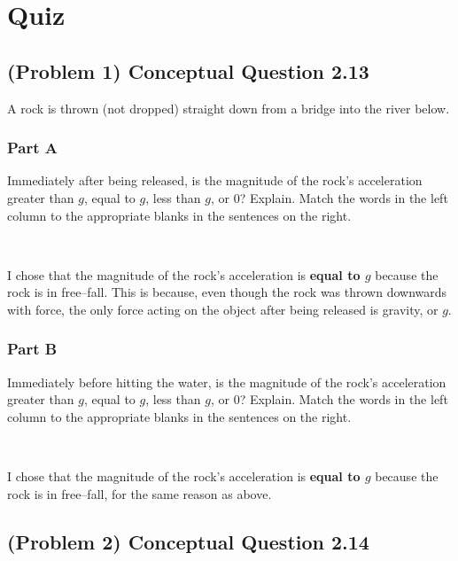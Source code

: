 
\section{Quiz}


\subsection{(Problem 1) Conceptual Question 2.13}

A rock is thrown (not dropped) straight down from a bridge into the river below.

\subsubsection{Part A}

Immediately after being released, is the magnitude of the rock's acceleration greater than $g$, equal to $g$, less than $g$, or 0? Explain.
Match the words in the left column to the appropriate blanks in the sentences on the right.

~
\begin{solution}
	I chose that the magnitude of the rock's acceleration is \textbf{equal to $g$} because the rock is in free--fall. This is because, even though the rock was thrown downwards with force, the only force acting on the object after being released is gravity, or $g$.
\end{solution}


\subsubsection{Part B}

Immediately before hitting the water, is the magnitude of the rock's acceleration greater than $g$, equal to $g$, less than $g$, or 0? Explain.
Match the words in the left column to the appropriate blanks in the sentences on the right.

~
\begin{solution}
	I chose that the magnitude of the rock's acceleration is \textbf{equal to $g$} because the rock is in free--fall, for the same reason as above.
\end{solution}

\newpage

\subsection{(Problem 2) Conceptual Question 2.14}


